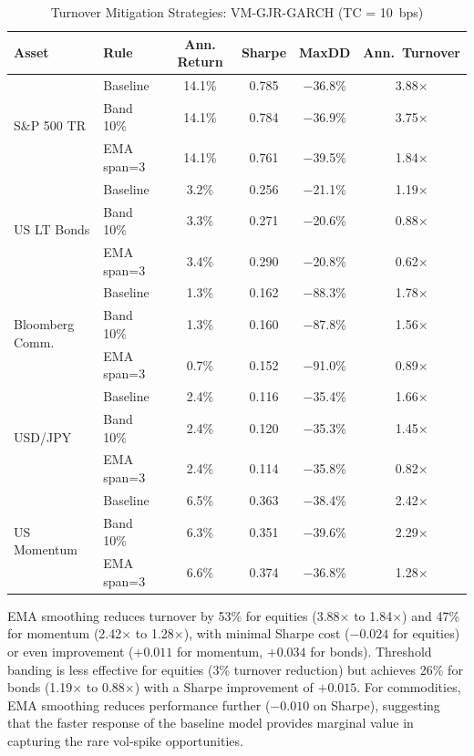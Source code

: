 \documentclass[12pt, a4paper]{article}
\begin{document}
\begin{table}[H]
  \centering
  \caption{Turnover Mitigation Strategies: VM-GJR-GARCH (TC = 10~bps)}
  \label{tab:mitigation}
  \small
  \begin{tabular}{llcccc}
    \toprule
    \textbf{Asset} & \textbf{Rule} & \textbf{Ann. Return} & \textbf{Sharpe}
                   & \textbf{MaxDD} & \textbf{Ann.\ Turnover} \\
    \midrule
    \multirow{3}{*}{S\&P 500 TR}
      & Baseline   & 14.1\% & 0.785 & $-$36.8\% & 3.88× \\
      & Band 10\%  & 14.1\% & 0.784 & $-$36.9\% & 3.75× \\
      & EMA span=3 & 14.1\% & 0.761 & $-$39.5\% & 1.84× \\
    \midrule
    \multirow{3}{*}{US LT Bonds}
      & Baseline   & 3.2\%  & 0.256 & $-$21.1\% & 1.19× \\
      & Band 10\%  & 3.3\%  & 0.271 & $-$20.6\% & 0.88× \\
      & EMA span=3 & 3.4\%  & 0.290 & $-$20.8\% & 0.62× \\
    \midrule
    \multirow{3}{*}{Bloomberg Comm.}
      & Baseline   & 1.3\%  & 0.162 & $-$88.3\% & 1.78× \\
      & Band 10\%  & 1.3\%  & 0.160 & $-$87.8\% & 1.56× \\
      & EMA span=3 & 0.7\%  & 0.152 & $-$91.0\% & 0.89× \\
    \midrule
    \multirow{3}{*}{USD/JPY}
      & Baseline   & 2.4\%  & 0.116 & $-$35.4\% & 1.66× \\
      & Band 10\%  & 2.4\%  & 0.120 & $-$35.3\% & 1.45× \\
      & EMA span=3 & 2.4\%  & 0.114 & $-$35.8\% & 0.82× \\
    \midrule
    \multirow{3}{*}{US Momentum}
      & Baseline   & 6.5\%  & 0.363 & $-$38.4\% & 2.42× \\
      & Band 10\%  & 6.3\%  & 0.351 & $-$39.6\% & 2.29× \\
      & EMA span=3 & 6.6\%  & 0.374 & $-$36.8\% & 1.28× \\
    \bottomrule
  \end{tabular}
\end{table}

EMA smoothing reduces turnover by 53\% for equities (3.88$\times$ to 1.84$\times$) and
47\% for momentum (2.42$\times$ to 1.28$\times$), with minimal Sharpe cost ($-0.024$ for
equities) or even improvement ($+0.011$ for momentum, $+0.034$ for bonds). Threshold
banding is less effective for equities (3\% turnover reduction) but achieves 26\% for
bonds (1.19$\times$ to 0.88$\times$) with a Sharpe improvement of $+0.015$. For
commodities, EMA smoothing reduces performance further ($-0.010$ on Sharpe), suggesting
that the faster response of the baseline model provides marginal value in capturing the
rare vol-spike opportunities.
\end{document}
